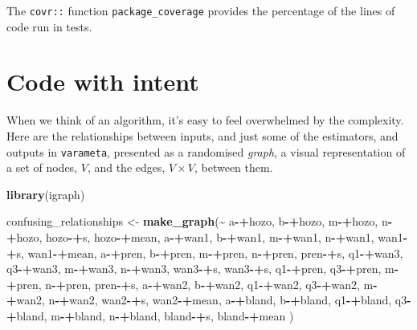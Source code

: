 \documentclass[
]{article}
\newenvironment{Shaded}{\begin{snugshade}}{\end{snugshade}}
\newcommand{\KeywordTok}[1]{\textcolor[rgb]{0.13,0.29,0.53}{\textbf{#1}}}
\newcommand{\NormalTok}[1]{#1}
\newcommand{\OperatorTok}[1]{\textcolor[rgb]{0.81,0.36,0.00}{\textbf{#1}}}
\newcommand{\StringTok}[1]{\textcolor[rgb]{0.31,0.60,0.02}{#1}}
\begin{document}
The \texttt{covr::} function \texttt{package\_coverage} provides the
percentage of the lines of code run in tests.

\hypertarget{code-with-intent}{%
\section{Code with intent}\label{code-with-intent}}

When we think of an algorithm, it's easy to feel overwhelmed by the
complexity. Here are the relationships between inputs, and just some of
the estimators, and outputs in \texttt{varameta}, presented as a
randomised \emph{graph}, a visual representation of a set of nodes,
\(V\), and the edges, \(V \times V\), between them.

\begin{Shaded}
\begin{Highlighting}[]
\KeywordTok{library}\NormalTok{(igraph)}

\NormalTok{confusing\_relationships <{-}}\StringTok{ }\KeywordTok{make\_graph}\NormalTok{(}\OperatorTok{\textasciitilde{}}\StringTok{ }
\NormalTok{a}\OperatorTok{{-}+}\NormalTok{hozo, b}\OperatorTok{{-}+}\NormalTok{hozo, m}\OperatorTok{{-}+}\NormalTok{hozo, n}\OperatorTok{{-}+}\NormalTok{hozo, hozo}\OperatorTok{{-}+}\NormalTok{s, hozo}\OperatorTok{{-}+}\NormalTok{mean,}
\NormalTok{a}\OperatorTok{{-}+}\NormalTok{wan1, b}\OperatorTok{{-}+}\NormalTok{wan1, m}\OperatorTok{{-}+}\NormalTok{wan1, n}\OperatorTok{{-}+}\NormalTok{wan1, wan1}\OperatorTok{{-}+}\NormalTok{s, wan1}\OperatorTok{{-}+}\NormalTok{mean,}
\NormalTok{a}\OperatorTok{{-}+}\NormalTok{pren, b}\OperatorTok{{-}+}\NormalTok{pren, m}\OperatorTok{{-}+}\NormalTok{pren, n}\OperatorTok{{-}+}\NormalTok{pren, pren}\OperatorTok{{-}+}\NormalTok{s,}
\NormalTok{q1}\OperatorTok{{-}+}\NormalTok{wan3, q3}\OperatorTok{{-}+}\NormalTok{wan3, m}\OperatorTok{{-}+}\NormalTok{wan3, n}\OperatorTok{{-}+}\NormalTok{wan3, wan3}\OperatorTok{{-}+}\NormalTok{s, wan3}\OperatorTok{{-}+}\NormalTok{s,}
\NormalTok{q1}\OperatorTok{{-}+}\NormalTok{pren, q3}\OperatorTok{{-}+}\NormalTok{pren, m}\OperatorTok{{-}+}\NormalTok{pren, n}\OperatorTok{{-}+}\NormalTok{pren, pren}\OperatorTok{{-}+}\NormalTok{s,}
\NormalTok{a}\OperatorTok{{-}+}\NormalTok{wan2, b}\OperatorTok{{-}+}\NormalTok{wan2, q1}\OperatorTok{{-}+}\NormalTok{wan2, q3}\OperatorTok{{-}+}\NormalTok{wan2, m}\OperatorTok{{-}+}\NormalTok{wan2, n}\OperatorTok{{-}+}\NormalTok{wan2, wan2}\OperatorTok{{-}+}\NormalTok{s, wan2}\OperatorTok{{-}+}\NormalTok{mean,}
\NormalTok{a}\OperatorTok{{-}+}\NormalTok{bland, b}\OperatorTok{{-}+}\NormalTok{bland, q1}\OperatorTok{{-}+}\NormalTok{bland, q3}\OperatorTok{{-}+}\NormalTok{bland, m}\OperatorTok{{-}+}\NormalTok{bland, n}\OperatorTok{{-}+}\NormalTok{bland, bland}\OperatorTok{{-}+}\NormalTok{s, bland}\OperatorTok{{-}+}\NormalTok{mean}
\NormalTok{           ) }


\end{Highlighting}
\end{Shaded}
\end{document}

